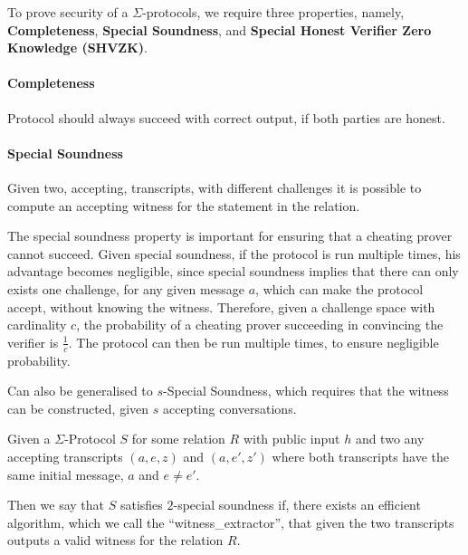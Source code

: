 
\begin{definition}
\label{def:sigma:sec}
To prove security of a $\Sigma$-protocols, we require three properties, namely,
\textbf{Completeness}, \textbf{Special Soundness}, and \textbf{Special Honest Verifier Zero Knowledge (SHVZK)}.
\end{definition}

\paragraph{Completeness}
Protocol should always succeed with correct output, if both parties are honest.

\paragraph{Special Soundness}
Given two, accepting, transcripts, with different challenges it is possible to
compute an accepting witness for the statement in the relation.

The special soundness property is important for ensuring that a cheating prover
cannot succeed. Given special soundness, if the protocol is run multiple times,
his advantage becomes negligible, since special soundness implies that there can
only exists one challenge, for any given message $a$, which can make the
protocol accept, without knowing the witness. Therefore, given a challenge space
with cardinality $c$, the probability of a cheating prover succeeding in
convincing the verifier is $\frac{1}{c}$. The protocol can then be run multiple
times, to ensure negligible probability.

Can also be generalised to $s$-Special Soundness, which requires that the
witness can be constructed, given $s$ accepting conversations.

\begin{definition}
Given a $\Sigma$-Protocol $S$ for some relation $R$ with public input $h$
and two any accepting transcripts $(a,e,z)$ and $(a,e',z')$
where both transcripts have the same initial message, $a$ and $e \neq e'$.

Then we say that $S$ satisfies $2$-special soundness if, there exists an
efficient  algorithm, which we call the ``witness\_extractor'',
that given the two transcripts outputs a valid witness for the relation $R$.
\end{definition}

